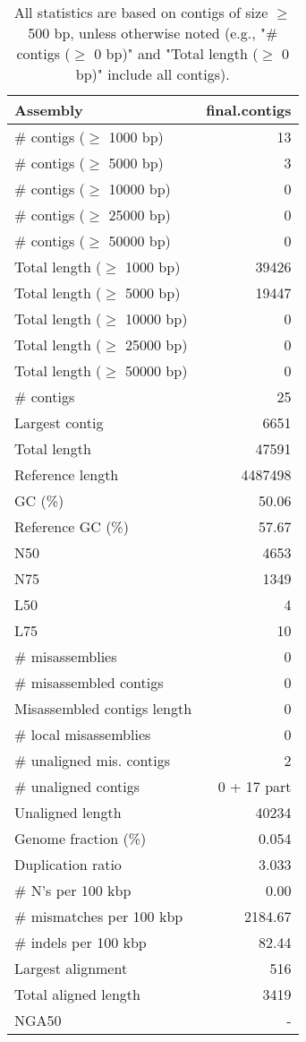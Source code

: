 \documentclass[12pt,a4paper]{article}
\begin{document}
\begin{table}[ht]
\begin{center}
\caption{All statistics are based on contigs of size $\geq$ 500 bp, unless otherwise noted (e.g., "\# contigs ($\geq$ 0 bp)" and "Total length ($\geq$ 0 bp)" include all contigs).}
\begin{tabular}{|l*{1}{|r}|}
\hline
Assembly & final.contigs \\ \hline
\# contigs ($\geq$ 1000 bp) & 13 \\ \hline
\# contigs ($\geq$ 5000 bp) & 3 \\ \hline
\# contigs ($\geq$ 10000 bp) & 0 \\ \hline
\# contigs ($\geq$ 25000 bp) & 0 \\ \hline
\# contigs ($\geq$ 50000 bp) & 0 \\ \hline
Total length ($\geq$ 1000 bp) & 39426 \\ \hline
Total length ($\geq$ 5000 bp) & 19447 \\ \hline
Total length ($\geq$ 10000 bp) & 0 \\ \hline
Total length ($\geq$ 25000 bp) & 0 \\ \hline
Total length ($\geq$ 50000 bp) & 0 \\ \hline
\# contigs & 25 \\ \hline
Largest contig & 6651 \\ \hline
Total length & 47591 \\ \hline
Reference length & 4487498 \\ \hline
GC (\%) & 50.06 \\ \hline
Reference GC (\%) & 57.67 \\ \hline
N50 & 4653 \\ \hline
N75 & 1349 \\ \hline
L50 & 4 \\ \hline
L75 & 10 \\ \hline
\# misassemblies & 0 \\ \hline
\# misassembled contigs & 0 \\ \hline
Misassembled contigs length & 0 \\ \hline
\# local misassemblies & 0 \\ \hline
\# unaligned mis. contigs & 2 \\ \hline
\# unaligned contigs & 0 + 17 part \\ \hline
Unaligned length & 40234 \\ \hline
Genome fraction (\%) & 0.054 \\ \hline
Duplication ratio & 3.033 \\ \hline
\# N's per 100 kbp & 0.00 \\ \hline
\# mismatches per 100 kbp & 2184.67 \\ \hline
\# indels per 100 kbp & 82.44 \\ \hline
Largest alignment & 516 \\ \hline
Total aligned length & 3419 \\ \hline
NGA50 & - \\ \hline
\end{tabular}
\end{center}
\end{table}
\end{document}
